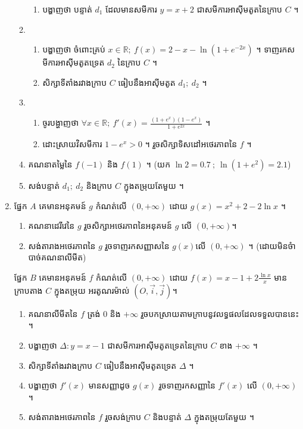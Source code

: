 \documentclass{officialexam}
\begin{document}
\begin{enumerate}[I]
\begin{enumerate}[1]
\begin{enumerate}[k]
			\item បង្ហាញថា បន្ទាត់ $d_1$ ដែលមានសមីការ $y=x+2$ ជាសមីការអាស៊ីមតូតនៃក្រាប $C$ ។
		\end{enumerate}
		\item \begin{enumerate}[k]
			\item បង្ហាញថា ចំពោះគ្រប់ $x\in\mathbb{R};~ f(x)=2-x-\ln\left(1+e^{-2x}\right)$ ។ ទាញរកសមីការអាស៊ីមតូតទ្រេត $d_2$ នៃក្រាប $C$ ។
			\item សិក្សាទីតាំងរវាងក្រាប $C$ ធៀបនឹងអាស៊ីមតូត $d_1;~d_2$ ។
		\end{enumerate}
		\item \begin{enumerate}[k]
			\item ចូរបង្ហាញថា $\forall x\in\mathbb{R};~f'(x)=\frac{\left(1+e^x\right)\left(1-e^x\right)}{1+e^{2x}}$ ។
			\item ដោះស្រាយវិសមីការ $1-e^x>0$ ។ រួចសិក្សាទិសដៅអថេរភាពនៃ $f$ ។
		\end{enumerate}
		\item គណនាតម្លៃនៃ $f(-1)$ និង $f(1)$ ។ (យក $\ln2=0.7~;~\ln\left(1+e^2\right)=2.1$)
		\item សង់បន្ទាត់ $d_1;~d_2$ និងក្រាប $C$ ក្នុងតម្រុយតែមួយ ។
	\end{enumerate}
	\item {\color{khtug}\sffamily ផ្នែក $A$} គេមានអនុគមន៍ $g$ កំណត់លើ $(0,+\infty)$ ដោយ $g(x)=x^2+2-2\ln x$ ។
	\begin{enumerate}[k]
		\item គណនាដេរីវេនៃ $g$ រួចសិក្សាអថេរភាពនៃអនុគមន៍ $g$ លើ $(0, +\infty)$​។
		\item សង់តារាងអថេរភាពនៃ $g$ រួចទាញរកសញ្ញាសនៃ $g(x)$ ​​លើ $(0,+\infty)$ ។ (ដោយមិនចំាបាច់គណនាលីមីត)
	\end{enumerate}
	{\color{khtug} \sffamily ផ្នែក $B$} គេមានអនុគមន៍ $f$ កំណត់លើ $(0,+\infty)$ ដោយ $f(x)=x-1+2\frac{\ln x}{x}$ មានក្រាបតាង $C$ ក្នុងតម្រុយ អរតូណរម៉ាល់ $(O, \vec{i}, \vec{j})$។
	\begin{enumerate}[k]
		\item គណនាលីមីតនៃ $f$ ត្រង់ $0$ និង $+\infty$ រួចបកស្រាយតាមក្រាបនូវលទ្ធផលដែលទទួលបាននេះ ។
		\item បង្ហាញថា $\Delta: y=x-1$ ជាសមីការអាស៊ីមតូតទ្រេតនៃក្រាប $C$ ខាង $+\infty$ ។
		\item សិក្សាទីតាំងរវាងក្រាប $C$ ធៀបនឹងអាស៊ីមតូតទ្រេត $\Delta$ ។
		\item បង្ហាញថា $f'(x)$ មានសញ្ញាដូច $g(x)$ រួចទាញរកសញ្ញានៃ $f'(x)$ លើ $(0, +\infty)$ ។
		\item សង់តារាងអថេរភាពនៃ $f$ រួចសង់ក្រាប $C$ និងបន្ទាត់ $\Delta$ ក្នុងតម្រុយតែមួយ ។

\end{enumerate}
\end{enumerate}
\end{document}
